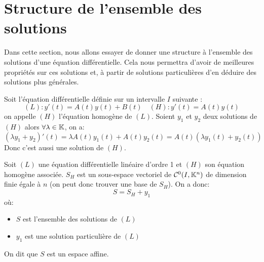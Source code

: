 
\section{Structure de l'ensemble des solutions}

Dans cette section, nous allons essayer de donner une structure à 
l'ensemble des solutions d'une équation différentielle. Cela nous 
permettra d'avoir de meilleures propriétés sur ces solutions et, à partir 
de solutions particulières d'en déduire des solutions plus générales. 

\vspace{0.5cm} 

Soit l'équation différentielle définie sur un intervalle $I$ suivante :
	\[ (L) : y'(t) = A(t) y(t) + B(t) \quad (H) : y'(t) = A(t)y(t) \] 
on appelle $(H)$ l'équation homogène de $(L)$. 
Soient $y_1$ et $y_2$ deux solutions de $(H)$ alors $ \forall \lambda \in \mathbb{K}$, on a: 
	\[ (\lambda y_1 + y_2)'(t) = \lambda A(t)y_1(t) + A(t) y_2(t) = A(t) (\lambda y_1(t) + y_2(t)) \]
Donc c'est aussi une solution de $(H)$. 

\begin{theorem}[Structure]
	Soit $(L)$ une équation différentielle linéaire d'ordre 1 et $(H)$ 
	son équation homogène associée. 
	$S_H$ est un sous-espace vectoriel de $ \mathcal{C}^0(I, \mathbb{K}^n)$ de dimension finie 
	égale à $n$ (on peut donc trouver une base de $S_H$). On a donc: 
		\[ \boxed{ S = S_H + y_1 } \]
	où: 
	\begin{itemize} 
		\item $S$ est l'ensemble des solutions de $(L)$
		\item $y_1$ est une solution particulière de $(L)$
	\end{itemize}
	On dit que $S$ est un espace affine. 
\end{theorem}

